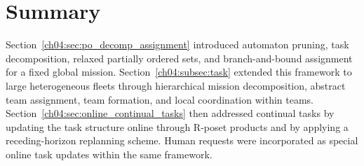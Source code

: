 \section{Summary}
\label{ch04:sec:summary}

 Section~\ref{ch04:sec:po_decomp_assignment}
introduced automaton pruning, task decomposition, relaxed partially ordered
sets, and branch-and-bound assignment for a fixed global mission.
Section~\ref{ch04:subsec:task} extended this framework to large heterogeneous
fleets through hierarchical mission decomposition, abstract team assignment,
team formation, and local coordination within teams.
Section~\ref{ch04:sec:online_continual_tasks} then addressed continual tasks by
updating the task structure online through R-poset products and by applying a
receding-horizon replanning scheme. Human requests were incorporated as special
online task updates within the same framework.

